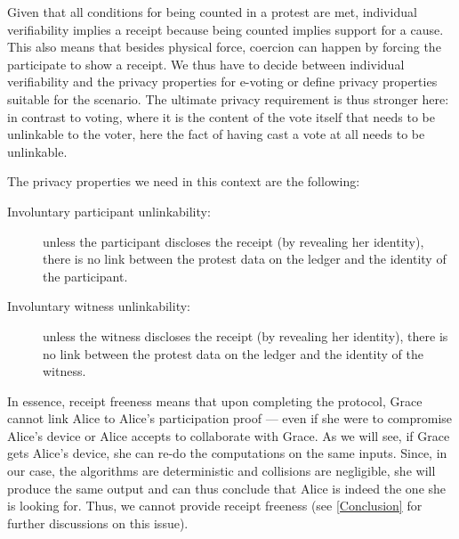 Given that all conditions for being counted in a protest are met, individual 
verifiability implies a receipt  because being counted implies support for a cause. 
This also means that besides physical force, coercion can happen by forcing the 
participate to show a receipt. 
We thus have to decide between individual verifiability and the privacy 
properties for e-voting or define privacy properties suitable for the scenario. 
The ultimate privacy requirement is thus stronger here: in contrast to voting, 
where it is the content of the vote itself that needs to be unlinkable to the 
voter, here the fact of having cast a vote at all needs to be unlinkable.

The privacy properties we need in this context are the following:
\begin{description}
  \item[Involuntary participant unlinkability:]  unless the participant discloses the receipt 
    (by revealing her identity), there is no link between the protest data on 
    the ledger and the identity of the participant.

  \item[Involuntary witness unlinkability:]  unless the witness discloses the receipt (by revealing her 
    identity), there is no link between the protest data on the ledger and the 
    identity of the witness.
\end{description}
In essence, receipt freeness means that upon completing the protocol, Grace cannot link Alice to Alice's participation proof --- even if she were to compromise Alice's device or Alice accepts to collaborate with Grace.
As we will see, if Grace gets Alice's device, she can re-do the computations on the same inputs.
Since, in our case, the algorithms are deterministic and collisions are negligible, she will produce the same output and can thus conclude that Alice is indeed the one she is looking for.
Thus, we cannot provide receipt freeness (see \cref{Conclusion} for further discussions on this issue).


